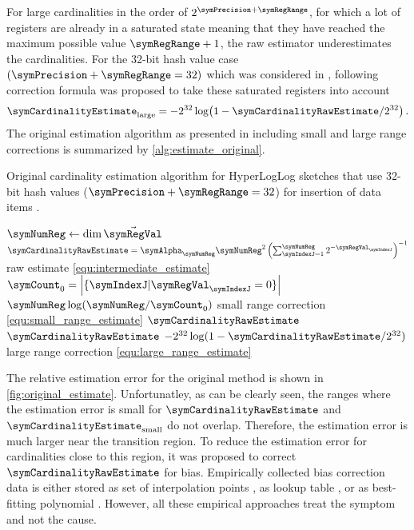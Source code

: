 \documentclass[a4paper]{scrartcl}
\begin{document}
For large cardinalities in the order of $2^{\symPrecision+\symRegRange}$, for which a lot of registers are already in a saturated state meaning that they have reached the maximum possible value $\symRegRange + 1$, the raw estimator underestimates the cardinalities. For the 32-bit hash value case $(\symPrecision+\symRegRange=32)$ which was considered in \cite{Flajolet2007}, following correction formula was proposed to take these saturated registers into account
\begin{equation}
\label{equ:large_range_estimate}
\symCardinalityEstimate_\text{large}
=
-2^{32}\log\!\left(1-\symCardinalityRawEstimate/2^{32}\right).
\end{equation}
The original estimation algorithm as presented in \cite{Flajolet2007} including small and large range corrections is summarized by \cref{alg:estimate_original}. 
\begin{algorithm}
\caption{Original cardinality estimation algorithm for HyperLogLog sketches that use 32-bit hash values ($\symPrecision+\symRegRange = 32$) for insertion of data items \cite{Flajolet2007}.}
\label{alg:estimate_original}
\begin{algorithmic}
\State $\symNumReg \gets \dim \vec{\symRegVal}$
\State $\symCardinalityRawEstimate = \symAlpha_\symNumReg \symNumReg^2\left(\sum_{\symIndexJ=1}^\symNumReg 2^{-\symRegVal_\symIndexJ}\right)^{-1}$
\Comment raw estimate \eqref{equ:intermediate_estimate}
\State $\symCount_0 = \left|\{\symIndexJ |\symRegVal_\symIndexJ=0\}\right|$
\State \Return $\symNumReg \log(\symNumReg / \symCount_0)$ \Comment small range correction \eqref{equ:small_range_estimate}
\Else
\State \Return $\symCardinalityRawEstimate$
\EndIf
{}
\State \Return $\symCardinalityRawEstimate$
\Else
\State\Return $-2^{32}\log(1-\symCardinalityRawEstimate/2^{32})$\Comment large range correction \eqref{equ:large_range_estimate}
\EndIf
\EndFunction
\end{algorithmic}
\end{algorithm}
The relative estimation error for the original method is shown in \cref{fig:original_estimate}. Unfortunatley, as can be clearly seen, the ranges where the estimation error is small for $\symCardinalityRawEstimate$ and $\symCardinalityEstimate_\text{small}$ do not overlap. Therefore, the estimation error is much larger near the transition region. To reduce the estimation error for cardinalities close to this region, it was proposed to correct $\symCardinalityRawEstimate$ for bias. Empirically collected bias correction data is either stored as set of interpolation points \cite{Heule2013}, as lookup table \cite{Rhodes2015}, or as best-fitting polynomial \cite{Sanfilippo2014}. However, all these empirical approaches treat the symptom and not the cause.
\end{document}
